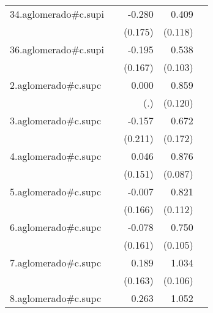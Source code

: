 {\begin{longtable}{l*{4}{D{.}{.}{-1}}}
\addlinespace
34.aglomerado#c.supi&                     &      -0.280         &       0.409\sym{***}&                     \\
            &                     &     (0.175)         &     (0.118)         &                     \\
\addlinespace
36.aglomerado#c.supi&                     &      -0.195         &       0.538\sym{***}&                     \\
            &                     &     (0.167)         &     (0.103)         &                     \\
\addlinespace
2.aglomerado#c.supc&                     &       0.000         &       0.859\sym{***}&                     \\
            &                     &         (.)         &     (0.120)         &                     \\
\addlinespace
3.aglomerado#c.supc&                     &      -0.157         &       0.672\sym{***}&                     \\
            &                     &     (0.211)         &     (0.172)         &                     \\
\addlinespace
4.aglomerado#c.supc&                     &       0.046         &       0.876\sym{***}&                     \\
            &                     &     (0.151)         &     (0.087)         &                     \\
\addlinespace
5.aglomerado#c.supc&                     &      -0.007         &       0.821\sym{***}&                     \\
            &                     &     (0.166)         &     (0.112)         &                     \\
\addlinespace
6.aglomerado#c.supc&                     &      -0.078         &       0.750\sym{***}&                     \\
            &                     &     (0.161)         &     (0.105)         &                     \\
\addlinespace
7.aglomerado#c.supc&                     &       0.189         &       1.034\sym{***}&                     \\
            &                     &     (0.163)         &     (0.106)         &                     \\
\addlinespace
8.aglomerado#c.supc&                     &       0.263         &       1.052\sym{***}&                     \\

\end{longtable}}
